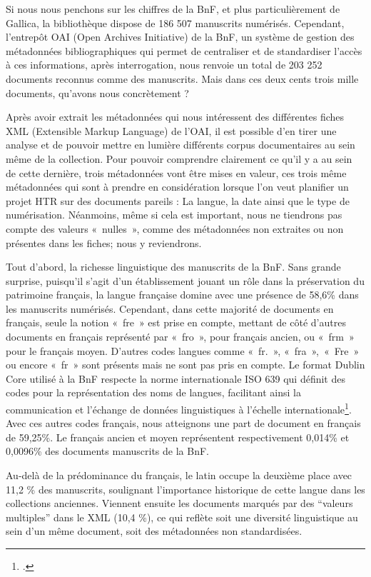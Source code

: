 \documentclass[a4paper,12pt,twoside]{book}
\begin{document}
	Si nous nous penchons sur les chiffres de la BnF, et plus particulièrement de Gallica, la bibliothèque dispose de 186 507 manuscrits numérisés. Cependant, l’entrepôt OAI  (Open Archives Initiative) de la BnF, un système de gestion des métadonnées bibliographiques qui permet de centraliser et de standardiser l’accès à ces informations, après interrogation, nous renvoie un total de 203 252 documents reconnus comme des manuscrits. Mais dans ces deux cents trois mille documents, qu’avons nous concrètement ? 
	
	Après avoir extrait les métadonnées qui nous intéressent des différentes fiches XML (Extensible Markup Language) de l’OAI, il est possible d’en tirer une analyse et de pouvoir mettre en lumière différents corpus documentaires au sein même de la collection. Pour pouvoir comprendre clairement ce qu’il y a au sein de cette dernière, trois métadonnées vont être mises en valeur, ces trois même métadonnées qui sont à prendre en considération lorsque l’on veut planifier un projet HTR sur des documents pareils : La langue, la date ainsi que le type de numérisation. Néanmoins, même si cela est important, nous ne tiendrons pas compte des valeurs « nulles », comme des métadonnées non extraites ou non présentes dans les fiches; nous y reviendrons. 
	
	Tout d’abord, la richesse linguistique des manuscrits de la BnF. Sans grande surprise, puisqu’il s’agit d’un établissement jouant un rôle dans la préservation du patrimoine français, la langue française domine avec une présence de 58,6\% dans les manuscrits numérisés. Cependant, dans cette majorité de documents en français, seule la notion « fre » est prise en compte, mettant de côté d’autres documents en français représenté par « fro », pour français ancien, ou « frm » pour le français moyen. D’autres codes langues comme « fr. », « fra », « Fre » ou encore « fr » sont présents mais ne sont pas pris en compte. Le format Dublin Core utilisé à la BnF respecte la norme internationale ISO 639 qui définit des codes pour la représentation des noms de langues, facilitant ainsi la communication et l’échange de données linguistiques à l’échelle internationale\footcite{byrum_iso_1999}. Avec ces autres codes français, nous atteignons une part de document en français de 59,25\%. Le français ancien et moyen représentent respectivement 0,014\% et 0,0096\% des documents manuscrits de la BnF. 
	
	Au-delà de la prédominance du français, le latin occupe la deuxième place avec 11,2 \% des manuscrits, soulignant l’importance historique de cette langue dans les collections anciennes. Viennent ensuite les documents marqués par des “valeurs multiples” dans le XML (10,4 \%), ce qui reflète soit une diversité linguistique au sein d’un même document, soit des métadonnées non standardisées.
	
\end{document}
